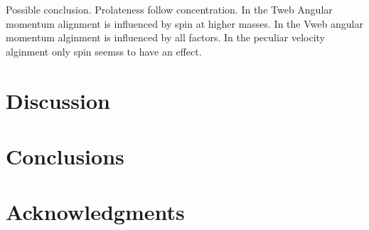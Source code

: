\documentclass[usenatbib]{mn2e}
\begin{document}
Possible conclusion. Prolateness follow concentration. In the Tweb Angular momentum alignment is influenced by spin at higher masses. In the Vweb angular momentum alginment is influenced by all factors. In the peculiar velocity alginment only spin seemss to have an effect.

\section{Discussion}
\label{sec:discussion}


\section{Conclusions}
\label{sec:conclusions}


\section*{Acknowledgments} 


 
\end{document}
